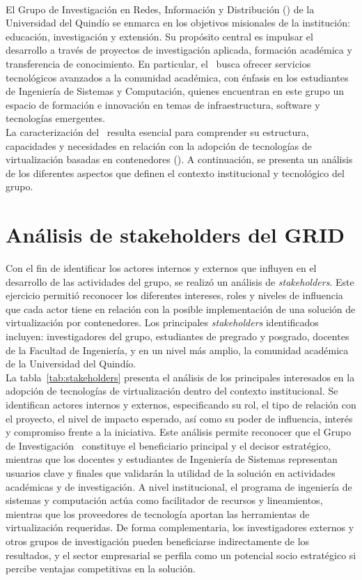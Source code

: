 \label{cap:caracterizacionGRID}
\mbox{}\\
El Grupo de Investigación en Redes, Información y Distribución (\GRID) de la Universidad del Quindío se enmarca en los objetivos misionales de la institución: educación, investigación y extensión. Su propósito central es impulsar el desarrollo a través de proyectos de investigación aplicada, formación académica y transferencia de conocimiento. En particular, el \GRID\ busca ofrecer servicios tecnológicos avanzados a la comunidad académica, con énfasis en los estudiantes de Ingeniería de Sistemas y Computación, quienes encuentran en este grupo un espacio de formación e innovación en temas de infraestructura, software y tecnologías emergentes.\\
La caracterización del \GRID\ resulta esencial para comprender su estructura, capacidades y necesidades en relación con la adopción de tecnologías de virtualización basadas en contenedores (\VBC). A continuación, se presenta un análisis de los diferentes aspectos que definen el contexto institucional y tecnológico del grupo.

\section{Análisis de stakeholders del GRID}
Con el fin de identificar los actores internos y externos que influyen en el desarrollo de las actividades del grupo, se realizó un análisis de \textit{stakeholders}. Este ejercicio permitió reconocer los diferentes intereses, roles y niveles de influencia que cada actor tiene en relación con la posible implementación de una solución de virtualización por contenedores. Los principales \textit{stakeholders} identificados incluyen: investigadores del grupo, estudiantes de pregrado y posgrado, docentes de la Facultad de Ingeniería, y en un nivel más amplio, la comunidad académica de la Universidad del Quindío.\\
La tabla~\ref{tab:stakeholders} presenta el análisis de los principales interesados en la adopción de tecnologías de virtualización dentro del contexto institucional. Se identifican actores internos y externos, especificando su rol, el tipo de relación con el proyecto, el nivel de impacto esperado, así como su poder de influencia, interés y compromiso frente a la iniciativa. Este análisis permite reconocer que el Grupo de Investigación \GRID\ constituye el beneficiario principal y el decisor estratégico, mientras que los docentes y estudiantes de Ingeniería de Sistemas representan usuarios clave y finales que validarán la utilidad de la solución en actividades académicas y de investigación. A nivel institucional, el programa de ingeniería de sistemas y computación actúa como facilitador de recursos y lineamientos, mientras que los proveedores de tecnología aportan las herramientas de virtualización requeridas. De forma complementaria, los investigadores externos y otros grupos de investigación pueden beneficiarse indirectamente de los resultados, y el sector empresarial se perfila como un potencial socio estratégico si percibe ventajas competitivas en la solución.


